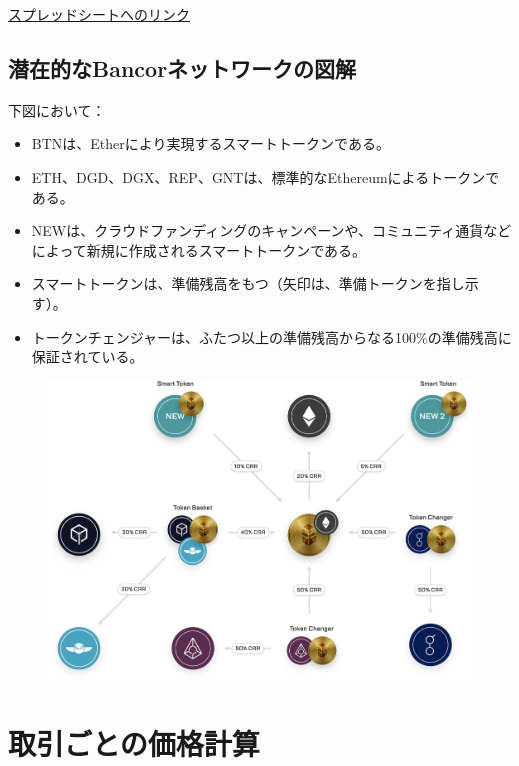 \documentclass{jsarticle}
\begin{document}
  \href{https://goo.gl/3hR6e8}{スプレッドシートへのリンク}

  \subsection{潜在的なBancorネットワークの図解}

  下図において：

  \begin{itemize}
    \item BTNは、Etherにより実現するスマートトークンである。
    \item ETH、DGD、DGX、REP、GNTは、標準的なEthereumによるトークンである。
    \item NEWは、クラウドファンディングのキャンペーンや、コミュニティ通貨などによって新規に作成されるスマートトークンである。
    \item スマートトークンは、準備残高をもつ（矢印は、準備トークンを指し示す）。  
    \item トークンチェンジャーは、ふたつ以上の準備残高からなる100\%の準備残高に保証されている。
  \end{itemize}

  \begin{figure}[h]
   \begin{center}
    \includegraphics{fig5.png}
   \end{center}
  \end{figure}

\section{取引ごとの価格計算}
\end{document}
